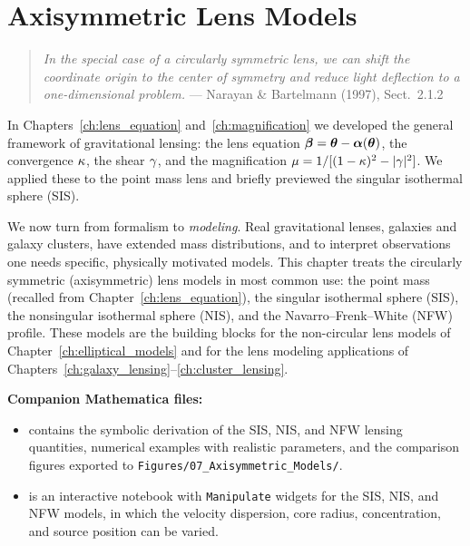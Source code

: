 
\chapter{Axisymmetric Lens Models}
\label{ch:axisymmetric_models}

\begin{quote}
\textit{In the special case of a circularly symmetric lens, we can shift the
coordinate origin to the center of symmetry and reduce light deflection to a
one-dimensional problem.}
\hfill --- Narayan \& Bartelmann (1997), Sect.~2.1.2
\end{quote}

\noindent
In Chapters~\ref{ch:lens_equation} and~\ref{ch:magnification} we
developed the general framework of gravitational lensing: the lens
equation $\boldsymbol{\beta} = \boldsymbol{\theta} - \boldsymbol{\alpha}(\boldsymbol{\theta})$, the convergence
$\kappa$, the shear $\gamma$, and the magnification
$\mu = 1/[(1 - \kappa)^2 - |\gamma|^2]$.  We applied these to the
point mass lens and briefly previewed the singular isothermal sphere
(SIS).

We now turn from formalism to \textit{modeling}.  Real gravitational
lenses, galaxies and galaxy clusters, have extended mass
distributions, and to interpret observations one needs specific,
physically motivated models.  This chapter treats the circularly
symmetric (axisymmetric) lens models in most common use: the point
mass (recalled from Chapter~\ref{ch:lens_equation}), the singular
isothermal sphere (SIS), the nonsingular isothermal sphere (NIS), and
the Navarro--Frenk--White (NFW) profile.  These models are the building
blocks for the non-circular lens models of
Chapter~\ref{ch:elliptical_models} and for the lens modeling
applications of
Chapters~\ref{ch:galaxy_lensing}--\ref{ch:cluster_lensing}.

\medskip
\noindent
\textbf{Companion Mathematica files:}
\begin{itemize}[nosep]
    \item {}
          contains the symbolic derivation of the SIS, NIS, and NFW
          lensing quantities, numerical examples with realistic
          parameters, and the comparison figures exported to
          \texttt{Figures/07\_Axisymmetric\_Models/}.
    \item {}
          is an interactive notebook with \texttt{Manipulate} widgets
          for the SIS, NIS, and NFW models, in which the velocity
          dispersion, core radius, concentration, and source position
          can be varied.
\end{itemize}


